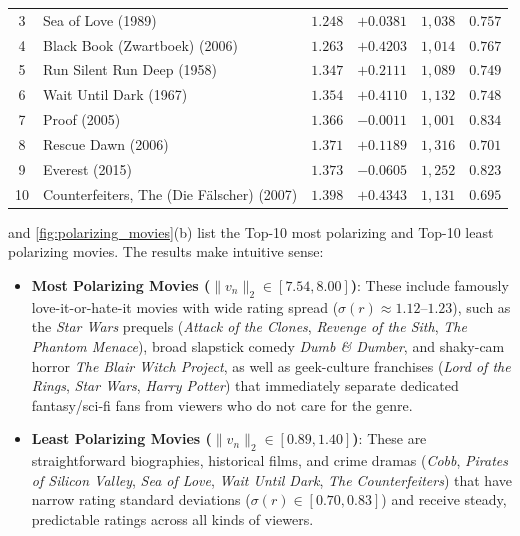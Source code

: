 \documentclass{article}
\theoremstyle{plain}
\theoremstyle{definition}
\begin{document}
\begin{table}[t]
\begin{center}
\begin{small}
\begin{tabular}{clrrrr}
3 & Sea of Love (1989) & $1.248$ & $+0.0381$ & $1,038$ & $0.757$ \\
4 & Black Book (Zwartboek) (2006) & $1.263$ & $+0.4203$ & $1,014$ & $0.767$ \\
5 & Run Silent Run Deep (1958) & $1.347$ & $+0.2111$ & $1,089$ & $0.749$ \\
6 & Wait Until Dark (1967) & $1.354$ & $+0.4110$ & $1,132$ & $0.748$ \\
7 & Proof (2005) & $1.366$ & $-0.0011$ & $1,001$ & $0.834$ \\
8 & Rescue Dawn (2006) & $1.371$ & $+0.1189$ & $1,316$ & $0.701$ \\
9 & Everest (2015) & $1.373$ & $-0.0605$ & $1,252$ & $0.823$ \\
10 & Counterfeiters, The (Die F\"alscher) (2007) & $1.398$ & $+0.4343$ & $1,131$ & $0.695$ \\
\bottomrule
\end{tabular}
\end{small}
\end{center}
\vskip -0.1in
\end{table}

 and \cref{fig:polarizing_movies}(b) list the Top-10 most polarizing and Top-10 least polarizing movies. The results make intuitive sense:
\begin{itemize}
    \item \textbf{Most Polarizing Movies ($\|v_n\|_2 \in [7.54, 8.00]$)}: These include famously love-it-or-hate-it movies with wide rating spread ($\sigma(r) \approx 1.12\text{--}1.23$), such as the \emph{Star Wars} prequels (\emph{Attack of the Clones}, \emph{Revenge of the Sith}, \emph{The Phantom Menace}), broad slapstick comedy \emph{Dumb \& Dumber}, and shaky-cam horror \emph{The Blair Witch Project}, as well as geek-culture franchises (\emph{Lord of the Rings}, \emph{Star Wars}, \emph{Harry Potter}) that immediately separate dedicated fantasy/sci-fi fans from viewers who do not care for the genre.
    \item \textbf{Least Polarizing Movies ($\|v_n\|_2 \in [0.89, 1.40]$)}: These are straightforward biographies, historical films, and crime dramas (\emph{Cobb}, \emph{Pirates of Silicon Valley}, \emph{Sea of Love}, \emph{Wait Until Dark}, \emph{The Counterfeiters}) that have narrow rating standard deviations ($\sigma(r) \in [0.70, 0.83]$) and receive steady, predictable ratings across all kinds of viewers.
\end{itemize}
\end{document}
